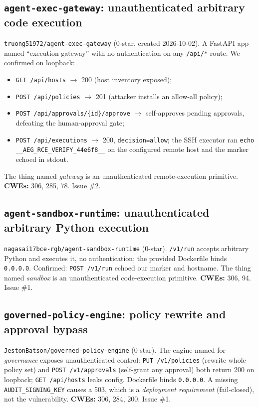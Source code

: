 \documentclass{llncs}
\begin{document}
\subsection{\texttt{agent-exec-gateway}: unauthenticated arbitrary code execution}\label{sub:aeg}
\texttt{truong51972/agent-exec-gateway} (0-star, created 2026-10-02). A FastAPI app named ``execution gateway'' with no authentication on any \texttt{/api/*} route. We confirmed on loopback:
\begin{itemize}
\item \texttt{GET /api/hosts} $\rightarrow$ 200 (host inventory exposed);
\item \texttt{POST /api/policies} $\rightarrow$ 201 (attacker installs an allow-all policy);
\item \texttt{POST /api/approvals/\{id\}/approve} $\rightarrow$ self-approves pending approvals, defeating the human-approval gate;
\item \texttt{POST /api/executions} $\rightarrow$ 200, \texttt{decision=allow}; the SSH executor ran \texttt{echo \_\_AEG\_RCE\_VERIFY\_44e6f8\_\_} on the configured remote host and the marker echoed in stdout.
\end{itemize}
The thing named \emph{gateway} is an unauthenticated remote-execution primitive. \textbf{CWEs:} 306, 285, 78. Issue \#2.

\subsection{\texttt{agent-sandbox-runtime}: unauthenticated arbitrary Python execution}\label{sub:asr}
\texttt{nagasai17bce-rgb/agent-sandbox-runtime} (0-star). \texttt{/v1/run} accepts arbitrary Python and executes it, no authentication; the provided Dockerfile binds \texttt{0.0.0.0}. Confirmed: \texttt{POST /v1/run} echoed our marker and hostname. The thing named \emph{sandbox} is an unauthenticated code-execution primitive. \textbf{CWEs:} 306, 94. Issue \#1.

\subsection{\texttt{governed-policy-engine}: policy rewrite and approval bypass}\label{sub:gpe}
\texttt{JestonBatson/governed-policy-engine} (0-star). The engine named for \emph{governance} exposes unauthenticated control: \texttt{PUT /v1/policies} (rewrite whole policy set) and \texttt{POST /v1/approvals} (self-grant any approval) both return 200 on loopback; \texttt{GET /api/hosts} leaks config. Dockerfile binds \texttt{0.0.0.0}. A missing \texttt{AUDIT\_SIGNING\_KEY} causes a 503, which is a \emph{deployment requirement} (fail-closed), not the vulnerability. \textbf{CWEs:} 306, 284, 200. Issue \#1.
\end{document}
